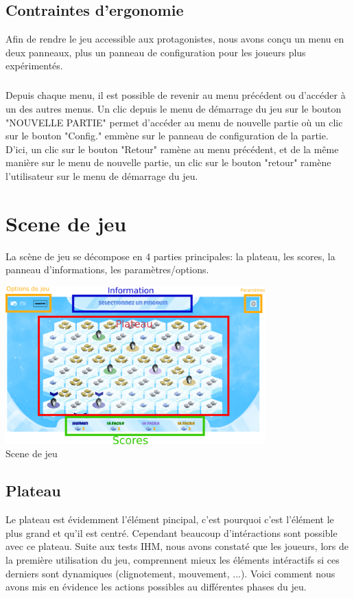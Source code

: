 \documentclass{report}
\begin{document}
 \section{ Contraintes d'ergonomie }
 
 Afin de rendre le jeu accessible aux protagonistes, nous avons conçu un menu en deux panneaux, plus un panneau de configuration pour les joueurs plus expérimentés.
 
 \paragraph{}
 Depuis chaque menu, il est possible de revenir au menu précédent ou d'accéder à un des autres menus. Un clic depuis le menu de démarrage du jeu sur le bouton "NOUVELLE PARTIE" permet d'accéder au menu de nouvelle partie où un clic sur le bouton "Config." emmène sur le panneau de configuration de la partie. D'ici, un clic sur le bouton "Retour" ramène au menu précédent, et de la même manière sur le menu de nouvelle partie, un clic sur le bouton "retour" ramène l'utilisateur sur le menu de démarrage du jeu.


\chapter{Scene de jeu}
La scène de jeu se décompose en 4 parties principales: la plateau, les scores, la panneau d'informations, les paramètres/options.

\begin{center}
  \includegraphics[width=10cm]{image/plateauIHM.png}
  \\
  Scene de jeu
\end{center}

\section{Plateau}
Le plateau est évidemment l'élément pincipal, c'est pourquoi c'est l'élément le plus grand et qu'il est centré. Cependant beaucoup d'intéractions sont possible avec ce plateau. Suite aux tests IHM,
nous avons constaté que les joueurs, lors de la première utilisation du jeu, comprennent mieux les éléments intéractifs si ces derniers sont dynamiques (clignotement, mouvement, ...). Voici comment nous avons mis en évidence les actions possibles au différentes phases du jeu.
\end{document}
